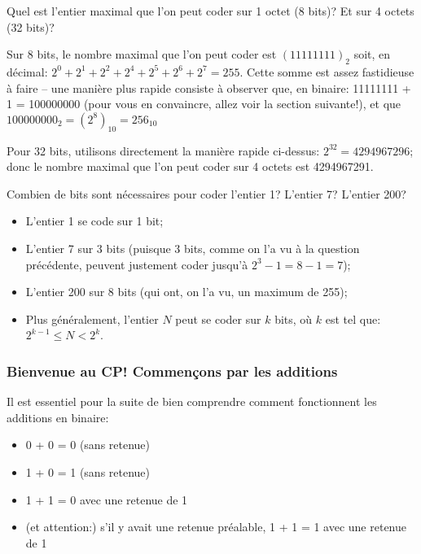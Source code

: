 \documentclass[12pt]{article}
\begin{document}
	 \begin{MonExo}
	 	Quel est l'entier maximal que l'on peut coder sur 1 octet (8 bits)? Et sur 4 octets (32 bits)?
	 \end{MonExo}
	\begin{MaReponse}
		Sur 8 bits, le nombre maximal que l'on peut coder est $(11111111)_2$ soit, en décimal: $2^0 + 2^1 + 2^2 + 2^4 + 2^5 + 2^6 + 2^7=255$. Cette somme est assez fastidieuse à faire -- une manière plus rapide consiste à observer que, en binaire: 11111111 + 1 = 100000000 (pour vous en convaincre, allez voir la section suivante!), et que $100000000_2 = (2^8)_{10} = 256_{10}$
		
		Pour 32 bits, utilisons directement la manière rapide ci-dessus: $2^{32}=4294967296$; donc le nombre maximal que l'on peut coder sur 4 octets est 4294967291.
	\end{MaReponse}
	 
	 \begin{MonExo}[et à l'inverse...]
	 	Combien de bits sont nécessaires pour coder l'entier 1? L'entier 7? L'entier 200?
	 \end{MonExo}
	 \begin{MaReponse}
	 	\begin{itemize}
	 		\item L'entier 1 se code sur 1 bit;
	 		\item L'entier 7 sur 3 bits (puisque 3 bits, comme on l'a vu à la question précédente, peuvent justement coder jusqu'à $2^3 - 1 = 8 - 1 = 7$);
	 		\item L'entier 200 sur 8 bits (qui ont, on l'a vu, un maximum de 255);
	 		\item Plus généralement, l'entier $N$ peut se coder sur $k$ bits, où $k$ est tel que: $2^{k-1} \le N < 2^k$.
	 	\end{itemize}
	 	 
	 \end{MaReponse}
	 
	 \subsubsection*{Bienvenue au CP! Commençons par les additions}
	 Il est essentiel pour la suite de bien comprendre comment fonctionnent les additions en binaire:
	 \begin{itemize}
	 	\item 0 + 0 = 0 (sans retenue)
	 	\item 1 + 0 = 1 (sans retenue)
	 	\item 1 + 1 = 0 avec une retenue de 1
	 	\item (et attention:) s'il y avait une retenue préalable, 1 + 1 = 1 avec une retenue de 1
	 \end{itemize}
	 
\end{document}
